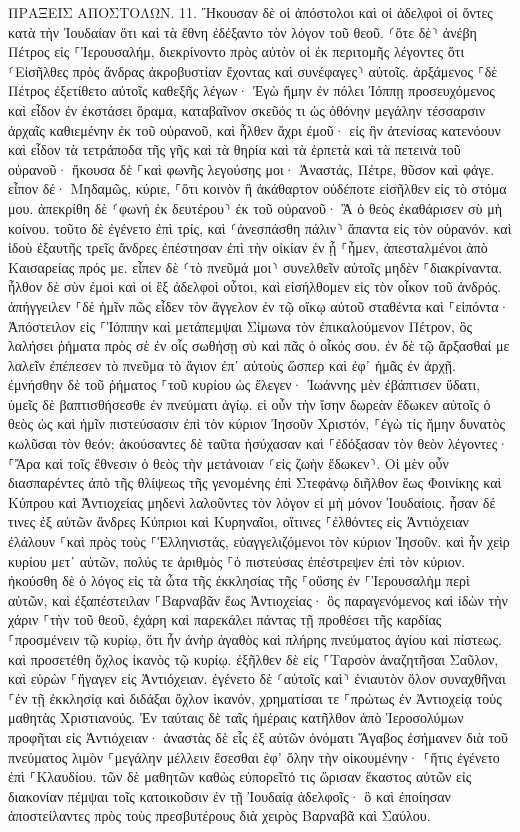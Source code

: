 \documentclass[twoside, 9pt]{extreport}
\begin{document}
ΠΡΑΞΕΙΣ ΑΠΟΣΤΟΛΩΝ.
11.
Ἤκουσαν δὲ οἱ ἀπόστολοι καὶ οἱ ἀδελφοὶ οἱ ὄντες κατὰ τὴν Ἰουδαίαν ὅτι καὶ τὰ ἔθνη ἐδέξαντο τὸν λόγον τοῦ θεοῦ. 
⸂ὅτε δὲ⸃ ἀνέβη Πέτρος εἰς ⸀Ἰερουσαλήμ, διεκρίνοντο πρὸς αὐτὸν οἱ ἐκ περιτομῆς 
λέγοντες ὅτι ⸂Εἰσῆλθες πρὸς ἄνδρας ἀκροβυστίαν ἔχοντας καὶ συνέφαγες⸃ αὐτοῖς. 
ἀρξάμενος ⸀δὲ Πέτρος ἐξετίθετο αὐτοῖς καθεξῆς λέγων· 
Ἐγὼ ἤμην ἐν πόλει Ἰόππῃ προσευχόμενος καὶ εἶδον ἐν ἐκστάσει ὅραμα, καταβαῖνον σκεῦός τι ὡς ὀθόνην μεγάλην τέσσαρσιν ἀρχαῖς καθιεμένην ἐκ τοῦ οὐρανοῦ, καὶ ἦλθεν ἄχρι ἐμοῦ· 
εἰς ἣν ἀτενίσας κατενόουν καὶ εἶδον τὰ τετράποδα τῆς γῆς καὶ τὰ θηρία καὶ τὰ ἑρπετὰ καὶ τὰ πετεινὰ τοῦ οὐρανοῦ· 
ἤκουσα δὲ ⸀καὶ φωνῆς λεγούσης μοι· Ἀναστάς, Πέτρε, θῦσον καὶ φάγε. 
εἶπον δέ· Μηδαμῶς, κύριε, ⸀ὅτι κοινὸν ἢ ἀκάθαρτον οὐδέποτε εἰσῆλθεν εἰς τὸ στόμα μου. 
ἀπεκρίθη δὲ ⸂φωνὴ ἐκ δευτέρου⸃ ἐκ τοῦ οὐρανοῦ· Ἃ ὁ θεὸς ἐκαθάρισεν σὺ μὴ κοίνου. 
τοῦτο δὲ ἐγένετο ἐπὶ τρίς, καὶ ⸂ἀνεσπάσθη πάλιν⸃ ἅπαντα εἰς τὸν οὐρανόν. 
καὶ ἰδοὺ ἐξαυτῆς τρεῖς ἄνδρες ἐπέστησαν ἐπὶ τὴν οἰκίαν ἐν ᾗ ⸀ἦμεν, ἀπεσταλμένοι ἀπὸ Καισαρείας πρός με. 
εἶπεν δὲ ⸂τὸ πνεῦμά μοι⸃ συνελθεῖν αὐτοῖς μηδὲν ⸀διακρίναντα. ἦλθον δὲ σὺν ἐμοὶ καὶ οἱ ἓξ ἀδελφοὶ οὗτοι, καὶ εἰσήλθομεν εἰς τὸν οἶκον τοῦ ἀνδρός. 
ἀπήγγειλεν ⸀δὲ ἡμῖν πῶς εἶδεν τὸν ἄγγελον ἐν τῷ οἴκῳ αὐτοῦ σταθέντα καὶ ⸀εἰπόντα· Ἀπόστειλον εἰς ⸀Ἰόππην καὶ μετάπεμψαι Σίμωνα τὸν ἐπικαλούμενον Πέτρον, 
ὃς λαλήσει ῥήματα πρὸς σὲ ἐν οἷς σωθήσῃ σὺ καὶ πᾶς ὁ οἶκός σου. 
ἐν δὲ τῷ ἄρξασθαί με λαλεῖν ἐπέπεσεν τὸ πνεῦμα τὸ ἅγιον ἐπ᾽ αὐτοὺς ὥσπερ καὶ ἐφ᾽ ἡμᾶς ἐν ἀρχῇ. 
ἐμνήσθην δὲ τοῦ ῥήματος ⸀τοῦ κυρίου ὡς ἔλεγεν· Ἰωάννης μὲν ἐβάπτισεν ὕδατι, ὑμεῖς δὲ βαπτισθήσεσθε ἐν πνεύματι ἁγίῳ. 
εἰ οὖν τὴν ἴσην δωρεὰν ἔδωκεν αὐτοῖς ὁ θεὸς ὡς καὶ ἡμῖν πιστεύσασιν ἐπὶ τὸν κύριον Ἰησοῦν Χριστόν, ⸀ἐγὼ τίς ἤμην δυνατὸς κωλῦσαι τὸν θεόν; 
ἀκούσαντες δὲ ταῦτα ἡσύχασαν καὶ ⸀ἐδόξασαν τὸν θεὸν λέγοντες· ⸀Ἄρα καὶ τοῖς ἔθνεσιν ὁ θεὸς τὴν μετάνοιαν ⸂εἰς ζωὴν ἔδωκεν⸃. 
Οἱ μὲν οὖν διασπαρέντες ἀπὸ τῆς θλίψεως τῆς γενομένης ἐπὶ Στεφάνῳ διῆλθον ἕως Φοινίκης καὶ Κύπρου καὶ Ἀντιοχείας μηδενὶ λαλοῦντες τὸν λόγον εἰ μὴ μόνον Ἰουδαίοις. 
ἦσαν δέ τινες ἐξ αὐτῶν ἄνδρες Κύπριοι καὶ Κυρηναῖοι, οἵτινες ⸀ἐλθόντες εἰς Ἀντιόχειαν ἐλάλουν ⸀καὶ πρὸς τοὺς ⸀Ἑλληνιστάς, εὐαγγελιζόμενοι τὸν κύριον Ἰησοῦν. 
καὶ ἦν χεὶρ κυρίου μετ᾽ αὐτῶν, πολύς τε ἀριθμὸς ⸀ὁ πιστεύσας ἐπέστρεψεν ἐπὶ τὸν κύριον. 
ἠκούσθη δὲ ὁ λόγος εἰς τὰ ὦτα τῆς ἐκκλησίας τῆς ⸀οὔσης ἐν ⸀Ἰερουσαλὴμ περὶ αὐτῶν, καὶ ἐξαπέστειλαν ⸀Βαρναβᾶν ἕως Ἀντιοχείας· 
ὃς παραγενόμενος καὶ ἰδὼν τὴν χάριν ⸀τὴν τοῦ θεοῦ, ἐχάρη καὶ παρεκάλει πάντας τῇ προθέσει τῆς καρδίας ⸀προσμένειν τῷ κυρίῳ, 
ὅτι ἦν ἀνὴρ ἀγαθὸς καὶ πλήρης πνεύματος ἁγίου καὶ πίστεως. καὶ προσετέθη ὄχλος ἱκανὸς τῷ κυρίῳ. 
ἐξῆλθεν δὲ εἰς ⸀Ταρσὸν ἀναζητῆσαι Σαῦλον, 
καὶ εὑρὼν ⸀ἤγαγεν εἰς Ἀντιόχειαν. ἐγένετο δὲ ⸂αὐτοῖς καὶ⸃ ἐνιαυτὸν ὅλον συναχθῆναι ⸀ἐν τῇ ἐκκλησίᾳ καὶ διδάξαι ὄχλον ἱκανόν, χρηματίσαι τε ⸀πρώτως ἐν Ἀντιοχείᾳ τοὺς μαθητὰς Χριστιανούς. 
Ἐν ταύταις δὲ ταῖς ἡμέραις κατῆλθον ἀπὸ Ἱεροσολύμων προφῆται εἰς Ἀντιόχειαν· 
ἀναστὰς δὲ εἷς ἐξ αὐτῶν ὀνόματι Ἅγαβος ἐσήμανεν διὰ τοῦ πνεύματος λιμὸν ⸀μεγάλην μέλλειν ἔσεσθαι ἐφ᾽ ὅλην τὴν οἰκουμένην· ⸀ἥτις ἐγένετο ἐπὶ ⸀Κλαυδίου. 
τῶν δὲ μαθητῶν καθὼς εὐπορεῖτό τις ὥρισαν ἕκαστος αὐτῶν εἰς διακονίαν πέμψαι τοῖς κατοικοῦσιν ἐν τῇ Ἰουδαίᾳ ἀδελφοῖς· 
ὃ καὶ ἐποίησαν ἀποστείλαντες πρὸς τοὺς πρεσβυτέρους διὰ χειρὸς Βαρναβᾶ καὶ Σαύλου. 
\end{document}
